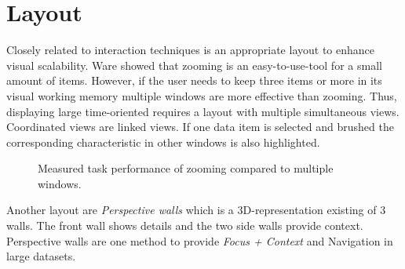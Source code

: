 \section{Layout}
Closely related to interaction techniques is an appropriate layout to enhance visual scalability. Ware\cite{Ware2012} showed that zooming is an easy-to-use-tool for a small amount of items. However, if the user needs to keep three items or more in its visual working memory multiple windows are more effective than zooming. Thus, displaying large time-oriented requires a layout with multiple simultaneous views. Coordinated views are linked views. If one data item is selected and brushed the corresponding characteristic in other windows is also highlighted.
\begin{figure}[H]
    \centering
    \caption{Measured task performance of zooming compared to multiple windows. \cite{Ware2012a}}
    \label{fig:my_label}
\end{figure}
Another layout are \textit{Perspective walls} which is a 3D-representation existing of 3 walls. The front wall shows details and the two side walls provide context. Perspective walls are one method to provide \textit{Focus + Context} and Navigation in large datasets.

